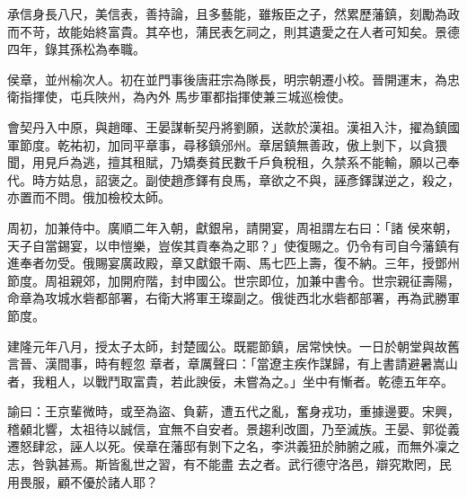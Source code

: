 \begin{pinyinscope}
 承信身長八尺，美信表，善持論，且多藝能，雖叛臣之子，然累歷藩鎮，刻勵為政而不苛，故能始終富貴。其卒也，蒲民表乞祠之，則其遺愛之在人者可知矣。景德四年，錄其孫松為奉職。



 侯章，並州榆次人。初在並門事後唐莊宗為隊長，明宗朝遷小校。晉開運末，為忠衛指揮使，屯兵陜州，為內外
 馬步軍都指揮使兼三城巡檢使。



 會契丹入中原，與趙暉、王晏謀斬契丹將劉願，送款於漢祖。漢祖入汴，擢為鎮國軍節度。乾祐初，加同平章事，尋移鎮邠州。章居鎮無善政，傲上剝下，以貪猥聞，用見戶為逃，擅其租賦，乃矯奏貧民數千戶負稅租，久禁系不能輸，願以己奉代。時方姑息，詔褒之。副使趙彥鐸有良馬，章欲之不與，誣彥鐸謀逆之，殺之，亦置而不問。俄加檢校太師。



 周初，加兼侍中。廣順二年入朝，獻銀帛，請開宴，周祖謂左右曰：「諸
 侯來朝，天子自當錫宴，以申愷樂，豈俟其貢奉為之耶？」使復賜之。仍令有司自今藩鎮有進奉者勿受。俄賜宴廣政殿，章又獻銀千兩、馬七匹上壽，復不納。三年，授鄧州節度。周祖親郊，加開府階，封申國公。世宗即位，加兼中書令。世宗親征壽陽，命章為攻城水砦都部署，右衛大將軍王璨副之。俄徙西北水砦都部署，再為武勝軍節度。



 建隆元年八月，授太子太師，封楚國公。既罷節鎮，居常怏怏。一日於朝堂與故舊言晉、漢間事，時有輕忽
 章者，章厲聲曰：「當遼主疾作謀歸，有上書請避暑嵩山者，我粗人，以戰鬥取富貴，若此諛佞，未嘗為之。」坐中有慚者。乾德五年卒。



 諭曰：王京輩微時，或至為盜、負薪，遭五代之亂，奮身戎功，重據邊要。宋興，稽顙北響，太祖待以誠信，宜無不自安者。景趨利改圖，乃至滅族。王晏、郭從義遷怒肆忿，誣人以死。侯章在藩邸有剝下之名，李洪義狃於肺腑之戚，而無外凜之志，咎孰甚焉。斯皆亂世之習，有不能盡
 去之者。武行德守洛邑，辯究欺罔，民用畏服，顧不優於諸人耶？



\end{pinyinscope}